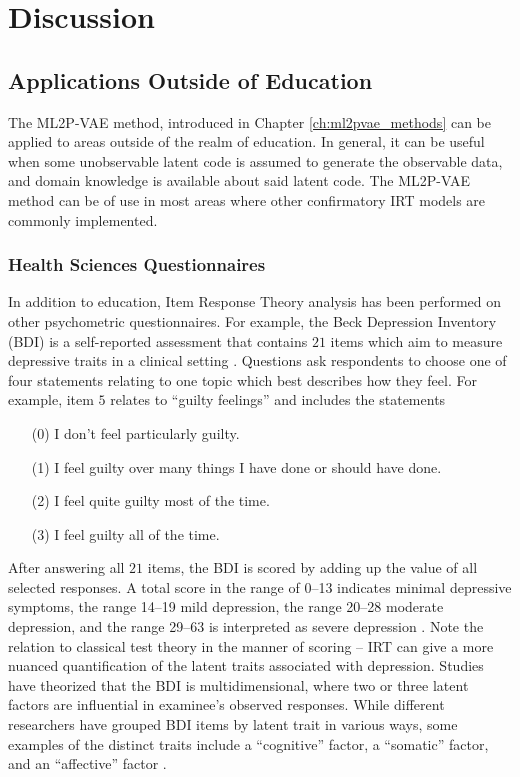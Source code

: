 \chapter{Discussion}\label{ch:conclusion}

\section{Applications Outside of Education}\label{sec:related_work}
The ML2P-VAE method, introduced in Chapter \ref{ch:ml2pvae_methods} can be applied to areas outside of the realm of education. In general, it can be useful when some unobservable latent code is assumed to generate the observable data, and domain knowledge is available about said latent code. The ML2P-VAE method can be of use in most areas where other confirmatory IRT models are commonly implemented. 

\subsection{Health Sciences Questionnaires}
In addition to education, Item Response Theory analysis has been performed on other psychometric questionnaires. For example, the Beck Depression Inventory (BDI) is a self-reported assessment that contains $21$ items which aim to measure depressive traits in a clinical setting \cite{beck1996}. Questions ask respondents to choose one of four statements relating to one topic which best describes how they feel. For example, item $5$ relates to ``guilty feelings'' and includes the statements
\begin{itemize}
  \item[(0)] I don't feel particularly guilty.
  \item[(1)] I feel guilty over many things I have done or should have done.
  \item[(2)] I feel quite guilty most of the time.
  \item[(3)] I feel guilty all of the time.
\end{itemize}

After answering all $21$ items, the BDI is scored by adding up the value of all selected responses. A total score in the range of 0--13 indicates minimal depressive symptoms, the range 14--19 mild depression, the range 20--28 moderate depression, and the range 29--63 is interpreted as severe depression \cite{smarr2011}. Note the relation to classical test theory in the manner of scoring -- IRT can give a more nuanced quantification of the latent traits associated with depression. Studies have theorized that the BDI is multidimensional, where two or three latent factors are influential in examinee's observed responses. While different researchers have grouped BDI items by latent trait in various ways, some examples of the distinct traits include a ``cognitive'' factor, a ``somatic'' factor, and an ``affective'' factor \cite{huang2015}.

